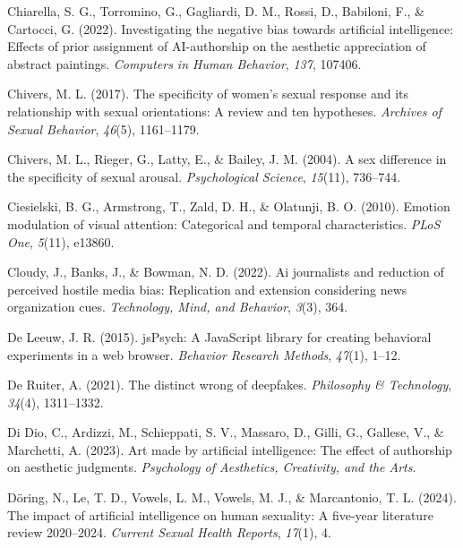 \documentclass[
  jou,
  floatsintext,
  longtable,
  nolmodern,
  notxfonts,
  notimes,
  colorlinks=true,linkcolor=blue,citecolor=blue,urlcolor=blue]{apa7}
\newlength{\cslhangindent}
\newenvironment{CSLReferences}[2] %
 {\begin{list}{}{%
  \setlength{\itemindent}{0pt}
  \setlength{\leftmargin}{0pt}
  \setlength{\parsep}{0pt}
  \ifodd #1
   \setlength{\leftmargin}{\cslhangindent}
   \setlength{\itemindent}{-1\cslhangindent}
  \fi
  \setlength{\itemsep}{#2\baselineskip}}}
 {\end{list}}
\begin{document}
\begin{CSLReferences}{1}{0}
Chiarella, S. G., Torromino, G., Gagliardi, D. M., Rossi, D., Babiloni,
F., \& Cartocci, G. (2022). Investigating the negative bias towards
artificial intelligence: Effects of prior assignment of AI-authorship on
the aesthetic appreciation of abstract paintings. \emph{Computers in
Human Behavior}, \emph{137}, 107406.

Chivers, M. L. (2017). The specificity of women's sexual response and
its relationship with sexual orientations: A review and ten hypotheses.
\emph{Archives of Sexual Behavior}, \emph{46}(5), 1161--1179.

Chivers, M. L., Rieger, G., Latty, E., \& Bailey, J. M. (2004). A sex
difference in the specificity of sexual arousal. \emph{Psychological
Science}, \emph{15}(11), 736--744.

Ciesielski, B. G., Armstrong, T., Zald, D. H., \& Olatunji, B. O.
(2010). Emotion modulation of visual attention: Categorical and temporal
characteristics. \emph{PLoS One}, \emph{5}(11), e13860.

Cloudy, J., Banks, J., \& Bowman, N. D. (2022). Ai journalists and
reduction of perceived hostile media bias: Replication and extension
considering news organization cues. \emph{Technology, Mind, and
Behavior}, \emph{3}(3), 364.

De Leeuw, J. R. (2015). jsPsych: A JavaScript library for creating
behavioral experiments in a web browser. \emph{Behavior Research
Methods}, \emph{47}(1), 1--12.

De Ruiter, A. (2021). The distinct wrong of deepfakes. \emph{Philosophy
\& Technology}, \emph{34}(4), 1311--1332.

Di Dio, C., Ardizzi, M., Schieppati, S. V., Massaro, D., Gilli, G.,
Gallese, V., \& Marchetti, A. (2023). Art made by artificial
intelligence: The effect of authorship on aesthetic judgments.
\emph{Psychology of Aesthetics, Creativity, and the Arts}.

Döring, N., Le, T. D., Vowels, L. M., Vowels, M. J., \& Marcantonio, T.
L. (2024). The impact of artificial intelligence on human sexuality: A
five-year literature review 2020--2024. \emph{Current Sexual Health
Reports}, \emph{17}(1), 4.


\end{CSLReferences}
\end{document}
